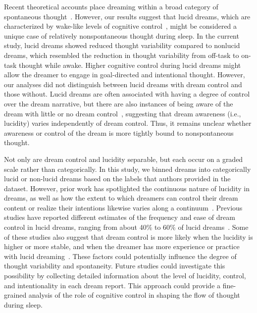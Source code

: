 \documentclass[10pt,a4paper,twocolumn]{article}
\begin{document}
\par
Recent theoretical accounts place dreaming within a broad category of spontaneous thought~\cite{christoff2016,mildner2019}. However, our results suggest that lucid dreams, which are characterized by wake-like levels of cognitive control~\cite{laberge2018,mallett2021,voss2013,windt2018}, might be considered a unique case of relatively nonspontaneous thought during sleep. In the current study, lucid dreams showed reduced thought variability compared to nonlucid dreams, which resembled the reduction in thought variability from off-task to on-task thought while awake. Higher cognitive control during lucid dreams might allow the dreamer to engage in goal-directed and intentional thought. However, our analyses did not distinguish between lucid dreams with dream control and those without. Lucid dreams are often associated with having a degree of control over the dream narrative, but there are also instances of being aware of the dream with little or no dream control~\cite{mallett2021,mallett2022}, suggesting that dream awareness (i.e., lucidity) varies independently of dream control. Thus, it remains unclear whether awareness or control of the dream is more tightly bound to nonspontaneous thought.

\par
Not only are dream control and lucidity separable, but each occur on a graded scale rather than categorically. In this study, we binned dreams into categorically lucid or non-lucid dreams based on the labels that authors provided in the dataset. However, prior work has spotlighted the continuous nature of lucidity in dreams, as well as how the extent to which dreamers can control their dream content or realize their intentions likewise varies along a continuum~\cite{mallett2021,solomonova2022,voss2013,windt2018}. Previous studies have reported different estimates of the frequency and ease of dream control in lucid dreams, ranging from about 40\% to 60\% of lucid dreams~\cite{mallett2021,mota-rolim2013,schredl2018,stumbrys2017,stumbrys2014,voss2012}. Some of these studies also suggest that dream control is more likely when the lucidity is higher or more stable, and when the dreamer has more experience or practice with lucid dreaming~\cite{mallett2021,schredl2018,stumbrys2017,stumbrys2014}. These factors could potentially influence the degree of thought variability and spontaneity. Future studies could investigate this possibility by collecting detailed information about the level of lucidity, control, and intentionality in each dream report. This approach could provide a fine-grained analysis of the role of cognitive control in shaping the flow of thought during sleep.
\end{document}
